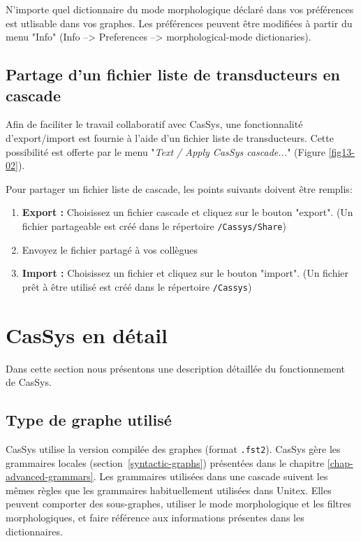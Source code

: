 N'importe quel dictionnaire du mode morphologique déclaré dans vos préférences est utlisable dans vos
graphes.
Les  préférences peuvent être modifiées à partir du menu "Info" (Info -->
Preferences --> morphological-mode dictionaries).

\subsection{Partage d'un fichier liste de transducteurs en cascade}
\label{subsec:shareCascade}

Afin de faciliter le travail collaboratif avec CasSys, une fonctionnalité d'export/import est
fournie à l'aide d'un fichier liste de transducteurs. Cette possibilité est offerte par le menu
"\textit{Text / Apply CasSys cascade...}" (Figure \ref{fig13-02}).

Pour partager un fichier liste de cascade, les points suivants doivent être remplis:
\begin{enumerate}
\item \textbf{Export :} Choisissez un fichier cascade et cliquez sur le bouton "export".
	(Un fichier partageable est créé dans le répertoire \texttt{/Cassys/Share})
\item Envoyez le fichier partagé à vos collègues
\item \textbf{Import :} Choisissez un fichier  et cliquez sur le bouton "import".
	(Un fichier prêt à être utilisé est créé dans le répertoire \texttt{/Cassys})
\end{enumerate}

\section{CasSys en détail}

Dans cette section nous présentons une description détaillée du fonctionnement de CasSys.

\subsection{Type de graphe utilisé}
\label{graphs-for-cassys}

CasSys utilise la version compilée des graphes (format \verb+.fst2+). CasSys gère les grammaires locales
(section~\ref{syntactic-graphs}) présentées dans le chapitre \ref{chap-advanced-grammars}.
Les grammaires utilisées dans une cascade suivent les mêmes règles que les grammaires habituellement
utilisées dans Unitex. Elles peuvent comporter des sous-graphes, utiliser le mode morphologique et les filtres
morphologiques, et faire référence aux informations présentes dans les dictionnaires. 

